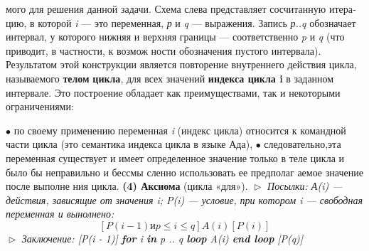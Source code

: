 									\noindent мого для решения данной задачи. Схема 
									слева представляет сосчитанную итера­
									цию, в которой \textit{i} — это переменная, \textit{р} и 
									\textit{q} — выражения. Запись \textit{р..q} обозначает 
									интервал, у которого нижняя и  верхняя
границы — соответственно \textit{p} и \textit{q} (что приводит, в частности, к возмож­
ности обозначения пустого интервала). Результатом этой конструкции 
является повторение внутреннего действия цикла, называемого \textbf{телом}
\textbf{цикла}, для всех значений \textbf{индекса цикла i} в заданном интервале. Это 
построение обладает как преимуществами, так и некоторыми ограни­чениями:

\noindent $\bullet$ по своему применению переменная \textit{i} (индекс  цикла)  относится к 
командной  части  цикла  (это  семантика  индекса  цикла  в  языке 
Ада),
\newline
$\bullet$ следовательно,эта переменная существует и имеет определенное 
значение только в теле цикла и было бы  неправильно и бессмы­
сленно использовать ее предполаг аемое значение после выполне­
ния цикла.
\newline
\textbf{(4) Аксиома} (цикла «для»).
\newline
$\vartriangleright$ \textit{Посылки: А(i) --- действия, зависящие от значения i; P(i) --- условие,}
\textit{при котором i --- свободная переменная и вынолнено:}
\begin{equation*}
\textit{$[P(i - 1) и p \leqslant i \leqslant q] A(i) [P(i)]$}
\end{equation*}
$\vartriangleright$ \textit{Заключение:  \textit{[P(i - 1)]} \textbf{for} \textit{i} \textbf{in} \textit{p .. q} \textbf{loop} \textit{A(i)} \textbf{end loop}} \textit{[P(q)]}

